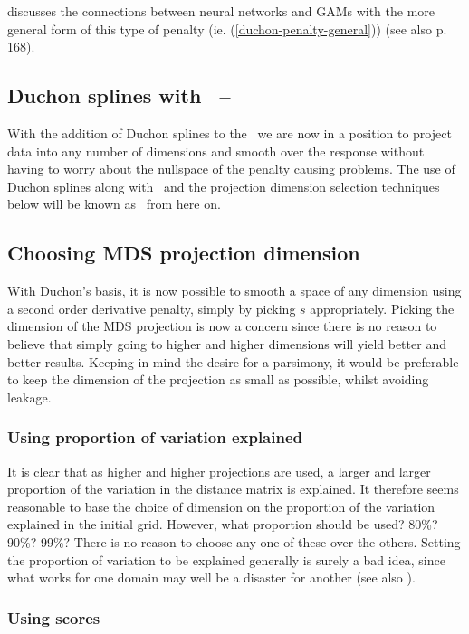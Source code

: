 \cite{girosi} discusses the connections between neural networks and GAMs with the more general form of this type of penalty (ie. (\ref{duchon-penalty-general})) (see also \cite{elements} p. 168).

\subsection{Duchon splines with \mdsap\ -- \mdsds}

With the addition of Duchon splines to the \mdsap\ we are now in a position to project data into any number of dimensions and smooth over the response without having to worry about the nullspace of the penalty causing problems. The use of Duchon splines along with \mdsap\ and the projection dimension selection techniques below will be known as \mdsds\ from here on.

\subsection{Choosing MDS projection dimension}

With Duchon's basis, it is now possible to smooth a space of any dimension using a second order derivative penalty, simply by picking $s$ appropriately. Picking the dimension of the MDS projection is now a concern since there is no reason to believe that simply going to higher and higher dimensions will yield better and better results. Keeping in mind the desire for a parsimony, it would be preferable to keep the dimension of the projection as small as possible, whilst avoiding leakage.

\subsubsection{Using proportion of variation explained}

It is clear that as higher and higher projections are used, a larger and larger proportion of the variation in the distance matrix is explained. It therefore seems reasonable to base the choice of dimension on the proportion of the variation explained in the initial grid. However, what proportion should be used? 80\%? 90\%? 99\%? There is no reason to choose any one of these over the others. Setting the proportion of variation to be explained generally is surely a bad idea, since what works for one domain may well be a disaster for another (see also ).

\subsubsection{Using scores}

